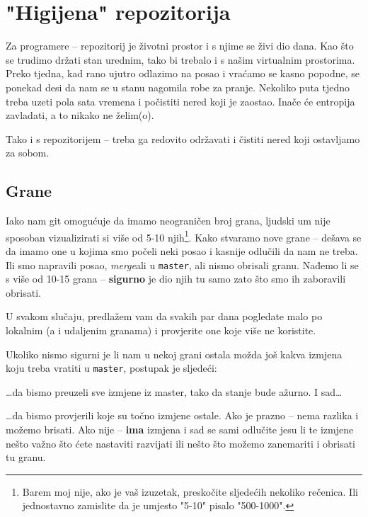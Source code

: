 \chapter*{"Higijena" repozitorija}

Za programere -- repozitorij je životni prostor i s njime se živi dio dana.
Kao što se trudimo držati stan urednim, tako bi trebalo i s našim virtualnim prostorima.
Preko tjedna, kad rano ujutro odlazimo na posao i vraćamo se kasno popodne, se ponekad desi da nam se u stanu nagomila robe za pranje.
Nekoliko puta tjedno treba uzeti pola sata vremena i počistiti nered koji je zaostao.
Inače će entropija zavladati, a to nikako ne želim(o).

Tako i s repozitorijem -- treba ga redovito održavati i čistiti nered koji ostavljamo za sobom.

\section*{Grane}

Iako nam git omogućuje da imamo neograničen broj grana, ljudski um nije sposoban vizualizirati si više od 5-10 njih\footnote{Barem moj nije, ako je vaš izuzetak, preskočite sljedećih nekoliko rečenica. Ili jednostavno zamislite da je umjesto "5-10" pisalo "500-1000".}.
Kako stvaramo nove grane -- dešava se da imamo one u kojima smo počeli neki posao i kasnije odlučili da nam ne treba.
Ili smo napravili posao, \emph{merge}ali u \verb+master+, ali nismo obrisali granu.
Nađemo li se s više od 10-15 grana -- \textbf{sigurno} je dio njih tu samo zato što smo ih zaboravili obrisati.

U svakom slučaju, predlažem vam da svakih par dana pogledate malo po lokalnim (a i udaljenim granama) i provjerite one koje više ne koristite.

Ukoliko nismo sigurni je li nam u nekoj grani ostala možda još kakva izmjena koju treba vratiti u \verb+master+, postupak je sljedeći:


\dots{}da bismo preuzeli sve izmjene iz master, tako da stanje bude ažurno.
I sad\dots


\dots{}da bismo provjerili koje su točno izmjene ostale.
Ako je prazno -- nema razlika i možemo brisati.
Ako nije -- \textbf{ima} izmjena i sad se sami odlučite jesu li te izmjene nešto važno što ćete nastaviti razvijati ili nešto što možemo zanemariti i obrisati tu granu.

